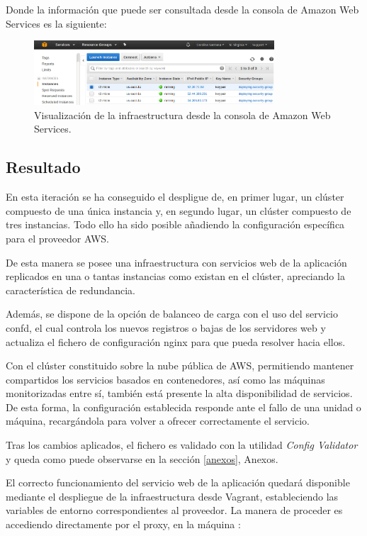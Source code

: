 Donde la información que puede ser consultada desde la consola de Amazon Web Services es la siguiente:

\begin{figure}[H]
\centering
\includegraphics[width=0.8\textwidth]{images/figures/aws-confd.png}
\caption{Visualización de la infraestructura desde la consola de Amazon Web Services.}
\end{figure}

\subsection{Resultado}

En esta iteración se ha conseguido el despligue de, en primer lugar, un clúster compuesto de una única instancia y, en segundo lugar, un clúster compuesto de tres instancias. Todo ello ha sido posible añadiendo la configuración específica para el proveedor AWS.

De esta manera se posee una infraestructura con servicios web de la aplicación replicados en una o tantas instancias como existan en el clúster, apreciando la característica de redundancia. 

Además, se dispone de la opción de balanceo de carga con el uso del servicio confd, el cual controla los nuevos registros o bajas de los servidores web y actualiza el fichero de configuración nginx para que pueda resolver hacia ellos. 

Con el clúster constituido sobre la nube pública de AWS, permitiendo mantener compartidos los servicios basados en contenedores, así como las máquinas monitorizadas entre sí, también está presente la alta disponibilidad de servicios. De esta forma, la configuración establecida responde ante el fallo de una unidad o máquina, recargándola para volver a ofrecer correctamente el servicio.

Tras los cambios aplicados, el fichero  es validado con la utilidad \textit{Config Validator} y queda como puede observarse en la sección \ref{anexos}, Anexos.

El correcto funcionamiento del servicio web de la aplicación quedará disponible mediante el despliegue de la infraestructura desde Vagrant, estableciendo las variables de entorno correspondientes al proveedor. La manera de proceder es accediendo directamente por el proxy, en la máquina :


